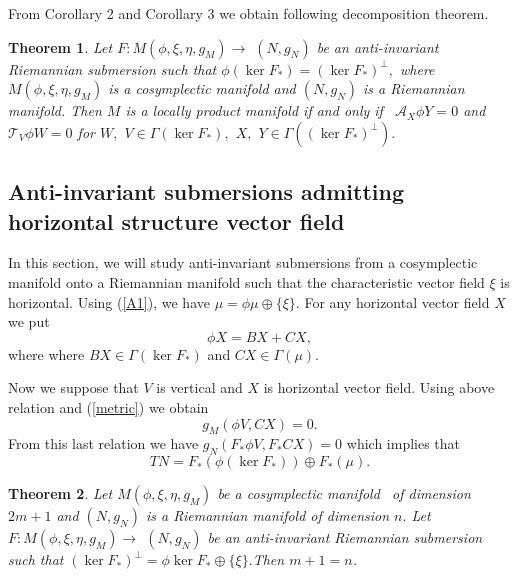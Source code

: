 \documentclass{amsart}
\newtheorem{theorem}{Theorem}
\theoremstyle{plain}
\numberwithin{equation}{section}
\begin{document}
From Corollary 2 and Corollary 3 we obtain following decomposition theorem.

\begin{theorem}
Let $F:M(\phi ,\xi ,\eta ,g_{M})\rightarrow $ $(N,g_{N})$ be an
anti-invariant Riemannian submersion such that $\phi (\ker F_{\ast })=(\ker
F_{\ast })^{\bot },$ where $M(\phi ,\xi ,\eta ,g_{M})$ is a cosymplectic
manifold and $(N,g_{N})$ is a Riemannian manifold. Then $M$ is a locally
product manifold if and only if \ $\mathcal{A}_{X}\phi Y=0$ and $\mathcal{T}_{V}\phi W=0$ for $W,$ $V\in \Gamma (\ker F_{\ast }),$ $X,$ $Y\in \Gamma
((\ker F_{\ast })^{\bot }).$
\end{theorem}

\subsection{\textbf{Anti-invariant submersions admitting horizontal
structure vector field }}

In this section, we will study anti-invariant submersions from a
cosymplectic manifold onto a Riemannian manifold such that the
characteristic vector field $\xi $ is horizontal. Using (\ref{A1}), we have $\mu =\phi \mu \oplus \{\xi \}.$ For any horizontal vector field $X$ we put 
\begin{equation}
\phi X=BX+CX,  \label{IREM}
\end{equation}where where $BX\in \Gamma (\ker F_{\ast })$ and $CX\in \Gamma (\mu ).$

Now we suppose that $V$ is vertical and $X$ is horizontal vector field.
Using above relation and (\ref{metric}) we obtain\begin{equation*}
g_{M}(\phi V,CX)=0.
\end{equation*}From this last relation we have $g_{N}(F_{\ast }\phi V,F_{\ast }CX)=0$ which
implies that 
\begin{equation}
TN=F_{\ast }(\phi (\ker F_{\ast }))\oplus F_{\ast }(\mu ).  \label{Ba}
\end{equation}

\begin{theorem}
Let $M(\phi ,\xi ,\eta ,g_{M})$ be a cosymplectic manifold \ of dimension $2m+1$ and $(N,g_{N})$ is a Riemannian manifold of dimension $n.$ Let $F:M(\phi ,\xi ,\eta ,g_{M})\rightarrow $ $(N,g_{N})$ be an anti-invariant
Riemannian submersion such that $(\ker F_{\ast })^{\bot }=\phi \ker F_{\ast
}\oplus \{\xi \}.$Then $m+1=n$.
\end{theorem}
\end{document}

